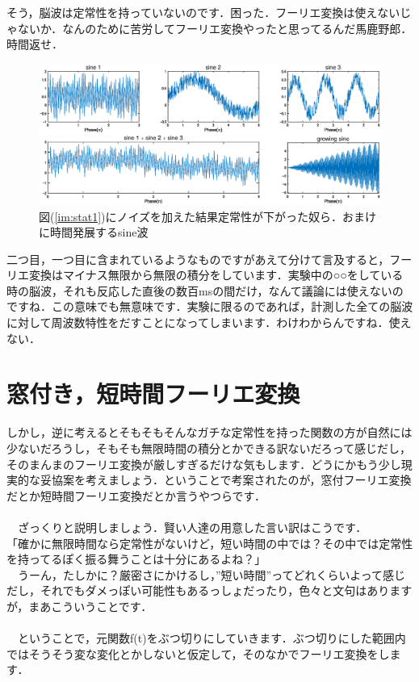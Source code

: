 \documentclass[11pt,a4paper]{ujreport} 	%
\begin{document}
そう，脳波は定常性を持っていないのです．困った．フーリエ変換は使えないじゃないか．なんのために苦労してフーリエ変換やったと思ってるんだ馬鹿野郎．時間返せ．

\begin{figure}[H]
  \centering
  \includegraphics[width=15cm]{../figures/stationarity2.eps}
  \caption{図(\ref{im:stat1})にノイズを加えた結果定常性が下がった奴ら．おまけに時間発展するsine波}
\end{figure}

二つ目，一つ目に含まれているようなものですがあえて分けて言及すると，フーリエ変換はマイナス無限から無限の積分をしています．実験中の○○をしている時の脳波，それも反応した直後の数百msの間だけ，なんて議論には使えないのですね．この意味でも無意味です．実験に限るのであれば，計測した全ての脳波に対して周波数特性をだすことになってしまいます．わけわからんですね．使えない．

\section{窓付き，短時間フーリエ変換}
しかし，逆に考えるとそもそもそんなガチな定常性を持った関数の方が自然には少ないだろうし，そもそも無限時間の積分とかできる訳ないだろって感じだし，そのまんまのフーリエ変換が厳しすぎるだけな気もします．どうにかもう少し現実的な妥協案を考えましょう．ということで考案されたのが，窓付フーリエ変換だとか短時間フーリエ変換だとか言うやつらです．\\
\\
　ざっくりと説明しましょう．賢い人達の用意した言い訳はこうです．\\
「確かに無限時間なら定常性がないけど，短い時間の中では？その中では定常性を持ってるぽく振る舞うことは十分にあるよね？」\\
　うーん，たしかに？厳密さにかけるし，”短い時間”ってどれくらいよって感じだし，それでもダメっぽい可能性もあるっしょだったり，色々と文句はありますが，まあこういうことです．\\
\\
　ということで，元関数f(t)をぶつ切りにしていきます．ぶつ切りにした範囲内ではそうそう変な変化とかしないと仮定して，そのなかでフーリエ変換をします．\\
\end{document}
